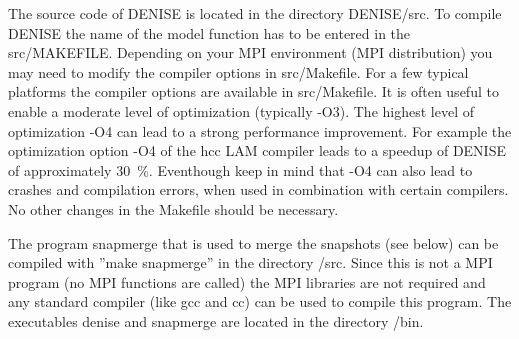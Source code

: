 The source code of DENISE is located in the directory DENISE/src. To compile DENISE the name of the model function has to be entered in the src/MAKEFILE. Depending on your MPI environment (MPI distribution) you may need to modify the compiler options in src/Makefile. For a few typical platforms the compiler options are available in src/Makefile. It is often useful to enable a moderate level of optimization (typically -O3). The highest level of optimization -O4 can lead to a strong performance improvement. For example the optimization option -O4 of the hcc LAM compiler leads to a speedup of DENISE of approximately 30~\%. Eventhough keep in mind that -O4 can also lead to crashes and compilation errors, when used in combination with certain compilers. No other changes in the Makefile should be necessary. 
{\color{blue}{\begin{verbatim}
# Makefile for DENISE

#--------------------------------------------------------
# edit here:

# source code for model generation

#MODEL = hh.c
MODEL = ../genmod/1D_linear_gradient_visc.c
MODEL_AC = ../genmod/1D_linear_gradient_ac.c
MODEL_EL = ../genmod/1D_linear_gradient_el.c
MODEL_VAC = ../genmod/1D_linear_gradient_viscac.c
EXEC= ../bin

# Description:
# CC = Compiler
# LFLAGS = Linker flag
# CFLAGS = Compiler flag

# LINUX with OpenMPI / IntelMPI and INTEL Compiler
# Use icc whenever possible, this will be much faster than gcc
CC=mpiicc
LFLAGS=-lm -lcseife -lstfinv -laff -lfourierxx -lfftw3 -lstdc++
CFLAGS=-O3
SFLAGS=-L./../contrib/libcseife -L./../contrib/bin
IFLAGS=-I./../contrib/libcseife -I./../contrib/header -I.

# LINUX with OpenMPI / IntelMPI and GCC Compiler
#CC=mpicc
#LFLAGS=-lm -lcseife -lstfinv -laff -lfourierxx -lfftw3 -lstdc++
#CFLAGS=-O3
#SFLAGS=-L./../contrib/libcseife -L./../contrib/bin
#IFLAGS=-I./../contrib/libcseife -I./../contrib/header -I.


# after this line, no further editing should be necessary
# --------------------------------------------------------
\end{verbatim}}} 

The program snapmerge that is used to merge the snapshots (see below) can be compiled with ''make snapmerge'' in the directory /src. Since this is not a MPI program (no MPI functions are called) the MPI libraries are not required and any standard compiler (like gcc and cc) can be used to compile this program. The executables denise and snapmerge are located in the directory /bin. 


